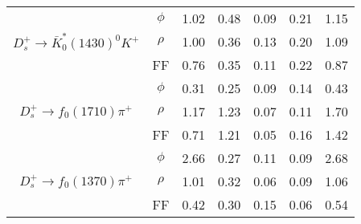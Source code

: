 {\begin{table}[tp]
\begin{tabular}{ccccccc}
            \multirow{3}{*}{$D_{s}^{+} \rightarrow \bar{K}^{*}_{0}(1430)^{0}K^{+}$}     & $\phi$        & 1.02      &0.48       &0.09   &0.21  &1.15      \\
                                                                                        & $\rho$        & 1.00      &0.36       &0.13   &0.20  &1.09  \\
                                                                                        & FF            & 0.76      &0.35       &0.11   &0.22  &0.87  \\
            \hline                                                                                                                                    
            \multirow{3}{*}{$D_{s}^{+} \rightarrow f_{0}(1710)\pi^{+}$}                 & $\phi$        & 0.31      &0.25       &0.09   &0.14  &0.43  \\
                                                                                        & $\rho$        & 1.17      &1.23       &0.07   &0.11  &1.70  \\
                                                                                        & FF            & 0.71      &1.21       &0.05   &0.16  &1.42  \\
            \hline                                                                                                                                    
            \multirow{3}{*}{$D_{s}^{+} \rightarrow f_{0}(1370)\pi^{+}$}                 & $\phi$        & 2.66      &0.27       &0.11   &0.09  &2.68   \\
                                                                                        & $\rho$        & 1.01      &0.32       &0.06   &0.09  &1.06  \\
                                                                                        & FF            & 0.42      &0.30       &0.15   &0.06  &0.54  \\
            \bottomrule\bottomrule
        \end{tabular}  
    \end{table}  

}
